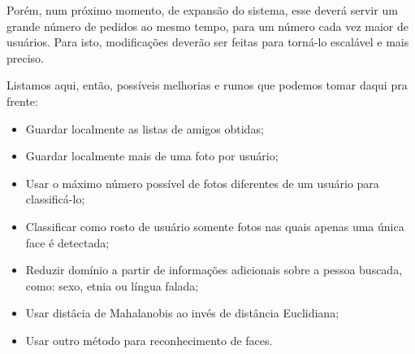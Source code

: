 \documentclass[10pt,a4paper]{article}
\begin{document}
	Porém, num próximo momento, de expansão do sistema, esse deverá servir um grande número de pedidos ao mesmo tempo, para um número cada vez maior de usuários. Para isto, modificações deverão ser feitas para torná-lo escalável e mais preciso. 

Listamos aqui, então, possíveis melhorias e rumos que podemos tomar
daqui pra frente:
\begin{itemize}
	\item Guardar localmente as listas de amigos obtidas;
	\item Guardar localmente mais de uma foto por usuário;
	\item Usar o máximo número possível de fotos diferentes de um usuário para classificá-lo;
	\item Classificar como rosto de usuário somente fotos nas quais apenas uma única face é detectada;
	\item Reduzir domínio a partir de informações adicionais sobre a pessoa buscada, como: sexo, etnia ou língua falada;
	\item Usar distâcia de Mahalanobis ao invés de distância Euclidiana;
	\item Usar outro método para reconhecimento de faces.
\end{itemize}

\begin{small}
  
\end{small}
\end{document}
